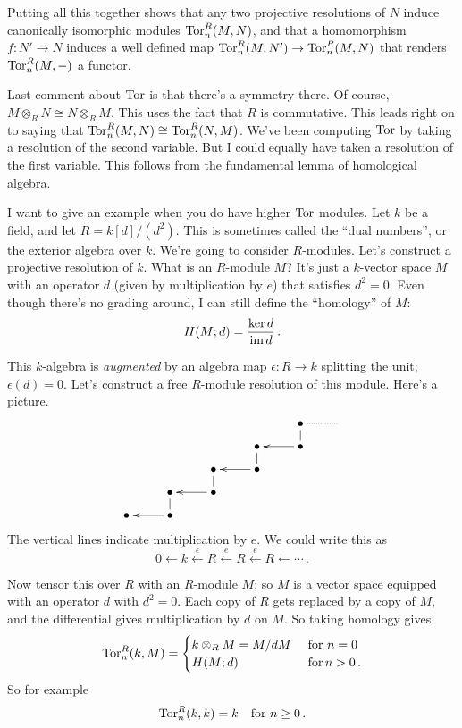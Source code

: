 Putting all this together shows that any two projective resolutions of $N$ 
induce canonically isomorphic modules $\operatorname{Tor}_n^R(M,N)$, and that a homomorphism
$f:N'\to N$ induces a well defined map $\operatorname{Tor}_n^R(M,N')\to\operatorname{Tor}_n^R(M,N)$
that renders $\operatorname{Tor}^R_n(M,-)$ a functor. 

Last comment about $\operatorname{Tor}$ is that there's a symmetry there. Of course, $M\otimes_R N\cong N\otimes_R M$. This uses the fact that $R$ is commutative. This leads right on to saying that $\operatorname{Tor}^R_n(M,N)\cong \operatorname{Tor}^R_n(N,M)$. We've been computing $\operatorname{Tor}$ by taking a resolution of the second variable. But I could equally have taken a resolution of the first variable. This follows from the fundamental lemma of homological algebra.


\begin{example}
I want to give an example when you do have higher $\operatorname{Tor}$ modules. Let $k$ be a field, and let $R=k[d]/(d^2)$. This is sometimes called the ``dual numbers'', or the exterior algebra over $k$. We're going to consider $R$-modules. Let's construct a projective resolution of $k$. What is an $R$-module $M$? It's just a $k$-vector space $M$ with an operator $d$ (given by multiplication by $e$) that satisfies $d^2=0$. Even though there's no grading around, I can still define the ``homology'' of $M$:
\[
H(M;d)=\frac{\ker d}{\operatorname{im} d}\,.
\]

This $k$-algebra is {\em augmented} by an algebra map $\epsilon:R\to k$ splitting the unit; $\epsilon(d)=0$. Let's construct a free $R$-module resolution of this module. Here's a picture.
\[
\xymatrix@R=8pt{
&&&& \bullet \ar@{..}[r] \ar@{-}[d] & \\
&&& \bullet \ar@{-}[d] & \bullet \ar[l]  \\
&& \bullet \ar@{-}[d] & \bullet \ar[l] \\
& \bullet \ar@{-}[d] & \bullet \ar[l] \\
\bullet & \bullet \ar[l]
}\]
The vertical lines indicate multiplication by $e$. We could write this as
\[
0\leftarrow 
k\xleftarrow{\epsilon}R\xleftarrow{e}R\xleftarrow{e}R\leftarrow\cdots\,.
\]

Now tensor this over $R$ with an $R$-module $M$; so $M$ is a vector space 
equipped with an operator $d$ with $d^2=0$. Each copy of $R$ gets replaced by
a copy of $M$, and the differential gives multiplication by $d$ on $M$. So 
taking homology gives 
\[
\operatorname{Tor}^R_n(k,M)=
\begin{cases}k\otimes_RM=M/dM\,&\,\hbox{for}\,\,n=0\\
H(M;d)\,&\,\hbox{for}\,n>0\,.
\end{cases}
\]
So for example 
\[
\operatorname{Tor}^R_n(k,k)=k\quad\hbox{for}\,\,n\geq0\,.
\]
\end{example}

